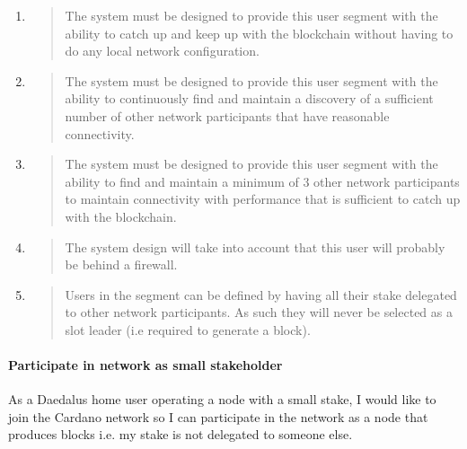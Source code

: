 \documentclass[11pt,a4paper]{article}
\begin{document}
\begin{enumerate}
\def\labelenumi{\arabic{enumi}.}
\item
  \begin{quote}
  The system must be designed to provide this user segment with the
  ability to catch up and keep up with the blockchain without having to
  do any local network configuration.
  \end{quote}
\item
  \begin{quote}
  The system must be designed to provide this user segment with the
  ability to continuously find and maintain a discovery of a sufficient
  number of other network participants that have reasonable
  connectivity.
  \end{quote}
\item
  \begin{quote}
  The system must be designed to provide this user segment with the
  ability to find and maintain a minimum of 3 other network participants
  to maintain connectivity with performance that is sufficient to catch
  up with the blockchain.
  \end{quote}
\item
  \begin{quote}
  The system design will take into account that this user will probably
  be behind a firewall.
  \end{quote}
\item
  \begin{quote}
  Users in the segment can be defined by having all their stake
  delegated to other network participants. As such they will never be
  selected as a slot leader (i.e required to generate a block).
  \end{quote}
\end{enumerate}

\paragraph{Participate in network as small stakeholder}

As a Daedalus home user operating a node with a small stake, I would
like to join the Cardano network so I can participate in the network as
a node that produces blocks i.e. my stake is not delegated to someone
else.
\end{document}
